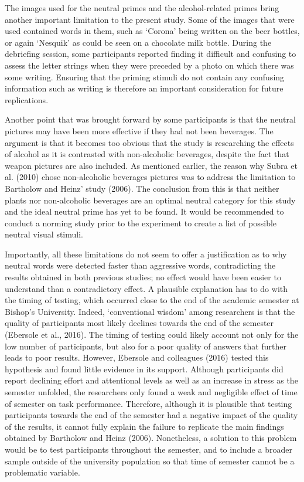 \documentclass[authordate, serif, review]{jote-article}
\begin{document}
\begin{multicols}{2}
 The images used for the neutral primes and the alcohol-related primes bring another important limitation to the present study. Some of the images that were used contained words in them, such as `Corona' being written on the beer bottles, or again `Nesquik' as could be seen on a chocolate milk bottle. During the debriefing session, some participants reported finding it difficult and confusing to assess the letter strings when they were preceded by a photo on which there was some writing. Ensuring that the priming stimuli do not contain any confusing information such as writing is therefore an important consideration for future replications.

Another point that was brought forward by some participants is that the neutral pictures may have been more effective if they had not been beverages. The argument is that it becomes too obvious that the study is researching the effects of alcohol as it is contrasted with non-alcoholic beverages, despite the fact that weapon pictures are also included. As mentioned earlier, the reason why Subra et al. (2010) chose non-alcoholic beverages pictures was to address the limitation to Bartholow and Heinz' study (2006). The conclusion from this is that neither plants nor non-alcoholic beverages are an optimal neutral category for this study and the ideal neutral prime has yet to be found. It would be recommended to conduct a norming study prior to the experiment to create a list of possible neutral visual stimuli. 

Importantly, all these limitations do not seem to offer a justification as to why neutral words were detected faster than aggressive words, contradicting the results obtained in both previous studies; no effect would have been easier to understand than a contradictory effect. A plausible explanation has to do with the timing of testing, which occurred close to the end of the academic semester at Bishop's University. Indeed, `conventional wisdom' among researchers is that the quality of participants most likely declines towards the end of the semester (Ebersole et al., 2016). The timing of testing could likely account not only for the low number of participants, but also for a poor quality of answers that further leads to poor results. However, Ebersole and colleagues (2016) tested this hypothesis and found little evidence in its support. Although participants did report declining effort and attentional levels as well as an increase in stress as the semester unfolded, the researchers only found a weak and negligible effect of time of semester on task performance. Therefore, although it is plausible that testing participants towards the end of the semester had a negative impact of the quality of the results, it cannot fully explain the failure to replicate the main findings obtained by Bartholow and Heinz (2006). Nonetheless, a solution to this problem would be to test participants throughout the semester, and to include a broader sample outside of the university population so that time of semester cannot be a problematic variable. 


\end{multicols}
\end{document}
